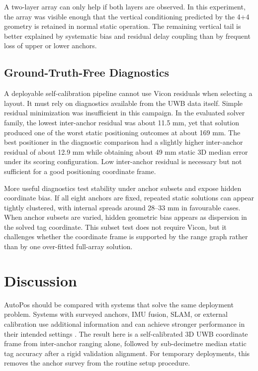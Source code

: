 \documentclass[journal,twoside,web]{ieeecolor}
\begin{document}
A two-layer array can only help if both layers are observed. In this experiment, the array was visible enough that the vertical conditioning predicted by the 4+4 geometry is retained in normal static operation. The remaining vertical tail is better explained by systematic bias and residual delay coupling than by frequent loss of upper or lower anchors.

\subsection{Ground-Truth-Free Diagnostics}
\label{sec:diagnostics}

A deployable self-calibration pipeline cannot use Vicon residuals when selecting a layout. It must rely on diagnostics available from the UWB data itself. Simple residual minimization was insufficient in this campaign. In the evaluated solver family, the lowest inter-anchor residual was about 11.5 mm, yet that solution produced one of the worst static positioning outcomes at about 169 mm. The best positioner in the diagnostic comparison had a slightly higher inter-anchor residual of about 12.9 mm while obtaining about 49 mm static 3D median error under its scoring configuration. Low inter-anchor residual is necessary but not sufficient for a good positioning coordinate frame.

More useful diagnostics test stability under anchor subsets and expose hidden coordinate bias. If all eight anchors are fixed, repeated static solutions can appear tightly clustered, with internal spreads around 28--33 mm in favourable cases. When anchor subsets are varied, hidden geometric bias appears as dispersion in the solved tag coordinate. This subset test does not require Vicon, but it challenges whether the coordinate frame is supported by the range graph rather than by one over-fitted full-array solution.

\section{Discussion}
\label{sec:discussion}

AutoPos should be compared with systems that solve the same deployment problem. Systems with surveyed anchors, IMU fusion, SLAM, or external calibration use additional information and can achieve stronger performance in their intended settings \cite{kok_2015,zihajehzadeh_2017,lutz_2019,nguyen_2025}. The result here is a self-calibrated 3D UWB coordinate frame from inter-anchor ranging alone, followed by sub-decimetre median static tag accuracy after a rigid validation alignment. For temporary deployments, this removes the anchor survey from the routine setup procedure.
\end{document}
